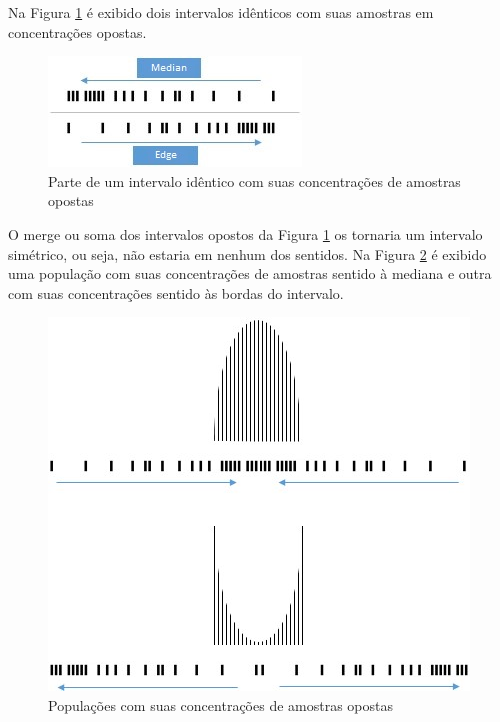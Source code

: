 Na Figura \ref{fig:consciousness_concentration_of_opposite_samples} é exibido dois intervalos idênticos com suas amostras em concentrações opostas.
	\begin{figure}[H]
	\caption{Parte de um intervalo idêntico com suas concentrações de amostras opostas}
	\label{fig:consciousness_concentration_of_opposite_samples}
	\centering
	\includegraphics[scale=1.2]{sections/images/consciousness_concentration_of_opposite_samples.jpg}
	\end{figure}

O merge ou soma dos intervalos opostos da Figura \ref{fig:consciousness_concentration_of_opposite_samples} os tornaria um intervalo simétrico, ou seja, não estaria em nenhum dos sentidos.
Na Figura \ref{fig:consciousness_concentration_of_opposite_samples_within_range} é exibido uma população com suas concentrações de amostras sentido à mediana e outra com suas concentrações sentido às bordas do intervalo.
	\begin{figure}[H]
	\caption{Populações com suas concentrações de amostras opostas}
	\label{fig:consciousness_concentration_of_opposite_samples_within_range}
	\centering
	\includegraphics[scale=.7]{sections/images/consciousness_concentration_of_opposite_samples_within_range.jpg}
	\end{figure}

